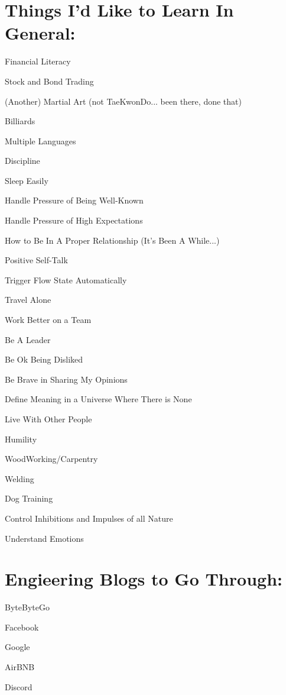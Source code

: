 \documentclass[12pt]{article}
\begin{document}
\section*{Things I'd Like to Learn In General:}
\begin{description}
    \item Financial Literacy
    \item Stock and Bond Trading
    \item (Another) Martial Art (not TaeKwonDo... been there, done that)
    \item Billiards
    \item Multiple Languages
    \item Discipline
    \item Sleep Easily
    \item Handle Pressure of Being Well-Known
    \item Handle Pressure of High Expectations
    \item How to Be In A Proper Relationship (It's Been A While...)
    \item Positive Self-Talk
    \item Trigger Flow State Automatically
    \item Travel Alone
    \item Work Better on a Team
    \item Be A Leader
    \item Be Ok Being Disliked
    \item Be Brave in Sharing My Opinions
    \item Define Meaning in a Universe Where There is None
    \item Live With Other People
    \item Humility
    \item WoodWorking/Carpentry
    \item Welding
    \item Dog Training
    \item Control Inhibitions and Impulses of all Nature
    \item Understand Emotions 

\end{description}


\section*{Engieering Blogs to Go Through:}
\begin{description}
    \item ByteByteGo
    \item Facebook
    \item Google
    \item AirBNB
    \item Discord
\end{description}
\end{document}
